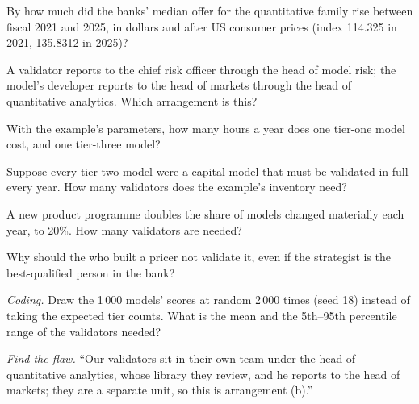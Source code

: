 \begin{exercise}[$\star$]\label{exo:in:bank-quant:1}
By how much did the banks' median offer for the quantitative family rise between fiscal 2021 and 2025, in dollars and
after US consumer prices (index 114.325 in 2021, 135.8312 in 2025)?
\end{exercise}

\begin{exercise}[$\star$]\label{exo:in:bank-quant:2}
A validator reports to the chief risk officer through the head of model risk; the model's developer reports to the head
of markets through the head of quantitative analytics. Which arrangement is this?
\end{exercise}

\begin{exercise}[$\star$]\label{exo:in:bank-quant:3}
With the example's parameters, how many hours a year does one tier-one model cost, and one tier-three model?
\end{exercise}

\begin{exercise}[$\star\star$]\label{exo:in:bank-quant:4}
Suppose every tier-two model were a capital model that must be validated in full every year. How many validators does the
example's inventory need?
\end{exercise}

\begin{exercise}[$\star\star$]\label{exo:in:bank-quant:5}
A new product programme doubles the share of models changed materially each year, to 20\%. How many validators are
needed?
\end{exercise}

\begin{exercise}[$\star\star$]\label{exo:in:bank-quant:6}
Why should the  who built a pricer not validate it, even if the strategist is the best-qualified person in
the bank?
\end{exercise}

\begin{exercise}[$\star\star\star$]\label{exo:in:bank-quant:7}
\emph{Coding.} Draw the 1\,000 models' scores at random 2\,000 times (seed 18) instead of taking the expected tier counts.
What is the mean and the 5th--95th percentile range of the validators needed?
\end{exercise}

\begin{exercise}[$\star\star\star$]\label{exo:in:bank-quant:8}
\emph{Find the flaw.} ``Our validators sit in their own team under the head of quantitative analytics, whose library they
review, and he reports to the head of markets; they are a separate unit, so this is arrangement (b).''
\end{exercise}

